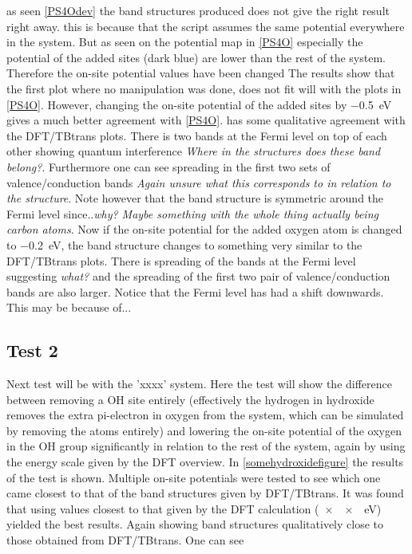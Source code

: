 as seen \cref{PS4Odev} the band structures produced does not give the right result right away. this is because that the script assumes the same potential everywhere in the system. But as seen on the potential map in \cref{PS4O} especially the potential of the added sites (dark blue) are lower than the rest of the system. Therefore the on-site potential values have been changed 
The results show that the first plot where no manipulation was done, does not fit will with the plots in \cref{PS4O}. However, changing the on-site potential of the added sites by \SI{-0.5}{\electronvolt} gives a much better agreement with \cref{PS4O}. has some qualitative agreement with the DFT/TBtrans plots. There is two bands at the Fermi level on top of each other showing quantum interference \textit{Where in the structures does these band belong?}. Furthermore  one can see spreading in the first two sets of valence/conduction bands \textit{Again unsure what this corresponds to in relation to the structure}. Note however that the band structure is symmetric around the Fermi level since..\textit{why? Maybe something with the whole thing actually being carbon atoms}. Now if the on-site potential for the added oxygen atom is changed to \SI{-0.2}{\electronvolt}, the band structure changes to something very similar to the DFT/TBtrans plots. There is spreading of the bands at the Fermi level suggesting \textit{what?} and the spreading of the first two pair of valence/conduction bands are also larger. Notice that the Fermi level has had a shift downwards. This may be because of... 
\subsection{Test 2}
Next test will be with the 'xxxx' system. Here the test will show the difference between removing a OH site entirely (effectively the hydrogen in hydroxide removes the extra pi-electron in oxygen from the system, which can be simulated by removing the atoms entirely) and lowering the on-site potential of the oxygen in the OH group significantly in relation to the rest of the system, again by using the energy scale given by the DFT overview. In \cref{somehydroxidefigure} the results of the test is shown. Multiple on-site potentials were tested to see which one came closest to that of the band structures given by DFT/TBtrans. It was found that using values closest to that given by the DFT calculation (\SI{xx}{\electronvolt}) yielded the best results. Again showing band structures qualitatively close to those obtained from DFT/TBtrans. One can see 
